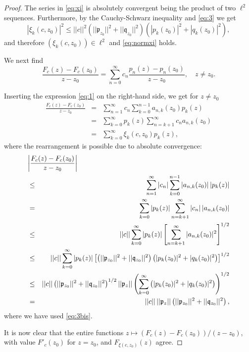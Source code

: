 \documentclass[10pt,a4paper]{amsart}
\begin{document}
\begin{proof} The series in \eqref{eq:xi} is absolutely convergent being the product of two $\ell^2$ sequences. Furthermore, by the Cauchy-Schwarz inequality and \eqref{eq:3} we get
$$
|\xi_k(c,z_0)|^2\le ||c||^2 (||\mathfrak{p}_{z_0}||^2+||\mathfrak{q}_{z_0}||^2)\left(|p_k(z_0)|^2+|q_k(z_0)|^2\right),
$$
and therefore $(\xi_k(c,z_0))\in\ell^2$ and \eqref{eq:normxi} holds.

We next find
$$
\frac{F_c(z)-F_c(z_0)}{z-z_0}=\sum_{n=0}^\infty c_n\frac{p_n(z)-p_n(z_0)}{z-z_0},\quad z\neq z_0.
$$ 

 Inserting the expression
\eqref{eq:1} on the right-hand side, we get for $z\neq z_0$
\begin{eqnarray*}
\frac{F_c(z)-F_c(z_0)}{z-z_0}&=&\sum_{n=1}^\infty c_n\sum_{k=0}^{n-1} a_{n,k}(z_0)p_k(z)\\
&=&\sum_{k=0}^\infty p_k(z) \sum_{n=k+1}^\infty c_n a_{n,k}(z_0)\\
&=&\sum_{k=0}^\infty\xi_k(c,z_0) p_k(z),
\end{eqnarray*}
where the rearrangement is possible due to absolute convergence:
\begin{eqnarray*}
\lefteqn{\left|\frac{F_c(z)-F_c(z_0)}{z-z_0}\right| }\\
&\le& \sum_{n=1}^\infty |c_n|\sum_{k=0}^{n-1} |a_{n,k}(z_0)|\,|p_k(z)|\\
&=&\sum_{k=0}^\infty |p_k(z)| \sum_{n=k+1}^\infty |c_n|\,|a_{n,k}(z_0)| \\
&\le& ||c||\sum_{k=0}^\infty |p_k(z)|\left[\sum_{n=k+1}^\infty |a_{n,k}(z_0)|^2\right]^{1/2}\\
&\le& ||c||\sum_{k=0}^\infty |p_k(z)|\left[\left(||\mathfrak{p}_{z_0}||^2+||\mathfrak{q}_{z_0}||^2\right)\left(|p_k(z_0)|^2+|q_k(z_0)|^2\right)\right]^{1/2}\\
&\le& ||c||\left(||\mathfrak{p}_{z_0}||^2+||\mathfrak{q}_{z_0}||^2\right)^{1/2}||\mathfrak{p}_z||\left(\sum_{k=0}^\infty\left(|p_k(z_0)|^2+|q_k(z_0)|^2\right)\right)^{1/2}\\
&=&||c||\,||\mathfrak{p}_z||\left(||\mathfrak{p}_{z_0}||^2+||\mathfrak{q}_{z_0}||^2\right),
\end{eqnarray*}
where we have used \eqref{eq:3bis}. 

It is now clear that the entire functions
$z\mapsto (F_c(z)-F_c(z_0))/(z-z_0)$, with value $F'_c(z_0)$ for $z=z_0$, and $F_{\xi(c,z_0)}(z)$ agree.
\end{proof}
\end{document}
